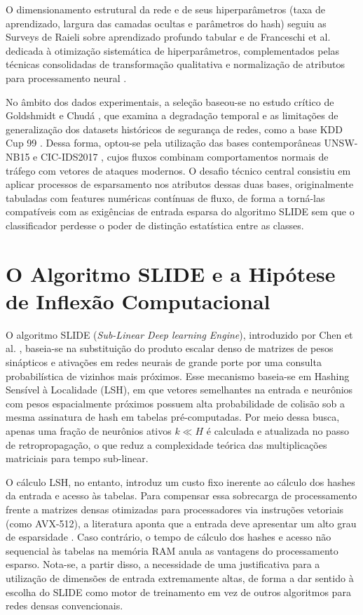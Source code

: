 \documentclass[11pt,a4paper,oneside]{article}
\begin{document}
O dimensionamento estrutural da rede e de seus hiperparâmetros (taxa de aprendizado, largura das camadas ocultas e parâmetros do hash) seguiu as Surveys de Raieli \cite{raieli2025tabular} sobre aprendizado profundo tabular e de Franceschi et al. \cite{franceschi2024hyperparameter} dedicada à otimização sistemática de hiperparâmetros, complementados pelas técnicas consolidadas de transformação qualitativa e normalização de atributos para processamento neural \cite{numberanalyticspreprocessing}.

No âmbito dos dados experimentais, a seleção baseou-se no estudo crítico de Goldshmidt e Chudá \cite{goldschmidt2025network}, que examina a degradação temporal e as limitações de generalização dos datasets históricos de segurança de redes, como a base KDD Cup 99 \cite{tavallaee2009detailed}. Dessa forma, optou-se pela utilização das bases contemporâneas UNSW-NB15 \cite{moustafa2015unsw} e CIC-IDS2017 \cite{sharafaldin2018toward}, cujos fluxos combinam comportamentos normais de tráfego com vetores de ataques modernos. O desafio técnico central consistiu em aplicar processos de esparsamento nos atributos dessas duas bases, originalmente tabuladas com features numéricas contínuas de fluxo, de forma a torná-las compatíveis com as exigências de entrada esparsa do algoritmo SLIDE sem que o classificador perdesse o poder de distinção estatística entre as classes.

\section{O Algoritmo SLIDE e a Hipótese de Inflexão Computacional}
O algoritmo SLIDE (\textit{Sub-Linear Deep learning Engine}), introduzido por Chen et al. \cite{chen2020slide}, baseia-se na substituição do produto escalar denso de matrizes de pesos sinápticos e ativações em redes neurais de grande porte por uma consulta probabilística de vizinhos mais próximos. Esse mecanismo baseia-se em Hashing Sensível à Localidade (LSH), em que vetores semelhantes na entrada e neurônios com pesos espacialmente próximos possuem alta probabilidade de colisão sob a mesma assinatura de hash em tabelas pré-computadas. Por meio dessa busca, apenas uma fração de neurônios ativos $k \ll H$ é calculada e atualizada no passo de retropropagação, o que reduz a complexidade teórica das multiplicações matriciais para tempo sub-linear.

O cálculo LSH, no entanto, introduz um custo fixo inerente ao cálculo dos hashes da entrada e acesso às tabelas. Para compensar essa sobrecarga de processamento frente a matrizes densas otimizadas para processadores via instruções vetoriais (como AVX-512), a literatura aponta que a entrada deve apresentar um alto grau de esparsidade \cite{chen2020slide}. Caso contrário, o tempo de cálculo dos hashes e acesso não sequencial às tabelas na memória RAM anula as vantagens do processamento esparso. Nota-se, a partir disso, a necessidade de uma justificativa para a utilização de dimensões de entrada extremamente altas, de forma a dar sentido à escolha do SLIDE como motor de treinamento em vez de outros algoritmos para redes densas convencionais.
\end{document}

